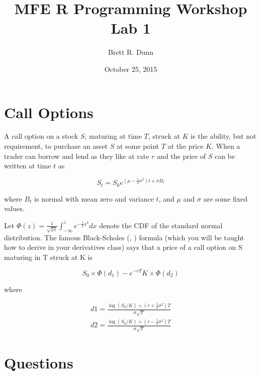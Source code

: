 \documentclass[12pt]{article}
\title{MFE R Programming Workshop Lab 1}
\date{October 25, 2015}
\author{Brett R. Dunn}
\begin{document}
\maketitle

\section{Call Options}
A call option on a stock $S$, maturing at time $T$, struck at $K$
is the ability, but not requirement, to purchase an asset $S$ at some
point $T$ at the price $K$. When a trader can borrow and lend as they like
at rate $r$ and the price of $S$ can be written at time $t$ as

\[
S_t = S_0 e^{\left(\mu-\frac{1}{2} \sigma^2 \right) t + \sigma B_t}
\]

where $B_t$ is normal with mean zero and variance $t$, and $\mu$ and
$\sigma$ are some fixed values.

Let $\Phi(z) = \frac{1}{\sqrt{2 \pi}} \int_{-\infty}^z e^{-\frac{1}{2}
  x^2}dx$ denote the CDF of the standard normal distribution. The
famous Black-Scholes (\cite{black1973pricing},
\cite{merton1973theory}) formula (which you will be taught how to
derive in your derivatives class) says that a price of a call option
on S maturing in T struck at K is

\[
S_0 \times \Phi(d_1) - e^{-rT} K \times \Phi(d_2)
\]

where

\begin{eqnarray*}
  d1 = \frac{\log(S_0 / K) + \left(r + \frac{1}{2} \sigma^2 \right)
    T}{\sigma \sqrt{T}} \\
  d2 = \frac{\log(S_0 / K) + \left(r - \frac{1}{2} \sigma^2 \right)
    T}{\sigma \sqrt{T}}
\end{eqnarray*}

\section{Questions}
\end{document}
